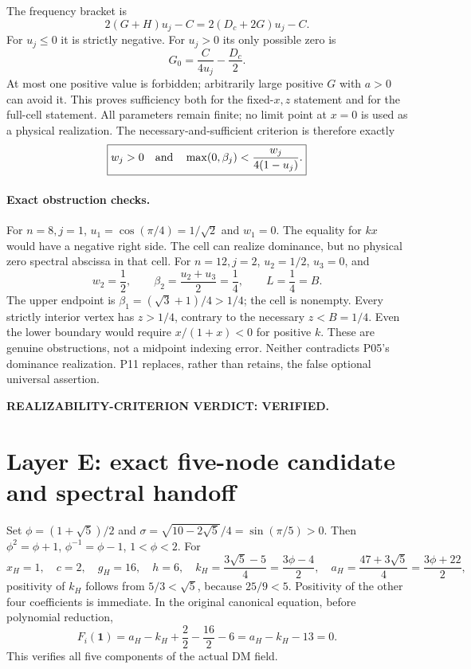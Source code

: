 \documentclass[11pt]{article}
\newcommand{\one}{\mathbf 1}
\begin{document}
The frequency bracket is
\[
 2(G+H)u_j-C=2(D_c+2G)u_j-C.
\]
For $u_j\le0$ it is strictly negative. For $u_j>0$ its only possible
zero is
\[
 G_0=\frac{C}{4u_j}-\frac{D_c}{2}.
\]
At most one positive value is forbidden; arbitrarily large positive $G$
with $a>0$ can avoid it. This proves sufficiency both for the
fixed-$x,z$ statement and for the full-cell statement. All parameters
remain finite; no limit point at $x=0$ is used as a physical realization.
The necessary-and-sufficient criterion is therefore exactly
\[
 \boxed{w_j>0\quad\hbox{and}\quad\max(0,\beta_j)<
                   \frac{w_j}{4(1-u_j)}.}
\]

\paragraph{Exact obstruction checks.}
For $n=8,j=1$, $u_1=\cos(\pi/4)=1/\sqrt2$ and $w_1=0$.
The equality for $kx$ would have a negative right side. The cell can
realize dominance, but no physical zero spectral abscissa in that cell.
For $n=12,j=2$, $u_2=1/2$, $u_3=0$, and
\[
 w_2=\frac12,\qquad \beta_2=\frac{u_2+u_3}{2}=\frac14,
 \qquad L=\frac14=B.
\]
The upper endpoint is $\beta_1=(\sqrt3+1)/4>1/4$; the cell is
nonempty. Every strictly interior vertex has $z>1/4$, contrary to the
necessary $z<B=1/4$. Even the lower boundary would require
$x/(1+x)<0$ for positive $k$. These are genuine obstructions, not a
midpoint indexing error. Neither contradicts P05's dominance realization.
P11 replaces, rather than retains, the false optional universal assertion.

\noindent\textbf{REALIZABILITY-CRITERION VERDICT: VERIFIED.}

\section{Layer E: exact five-node candidate and spectral handoff}
\label{sec:E}
Set $\phi=(1+\sqrt5)/2$ and
$\sigma=\sqrt{10-2\sqrt5}/4=\sin(\pi/5)>0$. Then
$\phi^2=\phi+1$, $\phi^{-1}=\phi-1$, $1<\phi<2$.
For
\[
 x_H=1,\quad c=2,\quad g_H=16,\quad h=6,\quad
 k_H=\frac{3\sqrt5-5}{4}=\frac{3\phi-4}{2},\quad
 a_H=\frac{47+3\sqrt5}{4}=\frac{3\phi+22}{2},
\]
positivity of $k_H$ follows from $5/3<\sqrt5$, because
$25/9<5$. Positivity of the other four coefficients is immediate.
In the original canonical equation, before polynomial reduction,
\[
 F_i(\one)=a_H-k_H+\frac22-\frac{16}{2}-6
          =a_H-k_H-13=0.
\]
This verifies all five components of the actual DM field.
\end{document}
